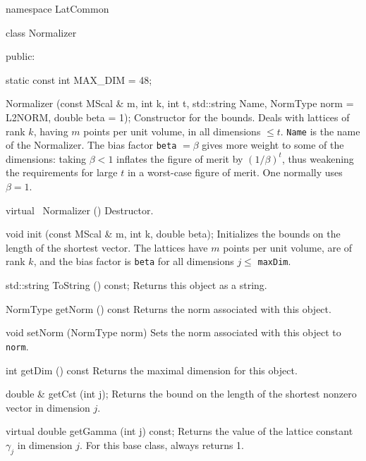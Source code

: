 namespace LatCommon {
          
class Normalizer {
public:

   static const int MAX_DIM = 48;

   Normalizer (const MScal & m, int k, int t, std::string Name,
               NormType norm = L2NORM, double beta = 1);
\endcode
 \tabb  Constructor for the bounds. Deals with lattices of rank $k$, having
   $m$ points per unit volume, in all dimensions  $\le t$. \texttt{Name}
   is the name of the Normalizer.
   The bias factor \texttt{beta} $= \beta$ gives more weight to some of the
   dimensions: taking $\beta < 1$ inflates the figure of merit by
   $(1/\beta)^t$, thus weakening the requirements for large $t$ in a 
   worst-case figure of merit.  %
   One normally uses $\beta = 1$. 
  \endtabb
\code

   virtual ~Normalizer ()  \endhide 
\endcode
 \tabb 
  Destructor.
 \endtabb
\code

   void init (const MScal & m, int k, double beta);
\endcode
 \tabb 
   Initializes the bounds on the length of the shortest vector. The lattices
   have $m$ points per unit volume, are of rank $k$, and the bias factor is 
   \texttt{beta} for all dimensions $j \le $ \texttt{maxDim}.
 \endtabb
\code

   std::string ToString () const;
\endcode
 \tabb 
   Returns this object as a string.
 \endtabb
\code

   NormType getNorm () const  \endhide
\endcode
 \tabb 
   Returns the norm associated with this object.
 \endtabb
\code

   void setNorm (NormType norm)  \endhide
\endcode
 \tabb 
   Sets the norm associated with this object to \texttt{norm}.
 \endtabb
\code

   int getDim () const  \endhide 
\endcode
 \tabb 
   Returns the maximal dimension for this object.
 \endtabb
\code

   double & getCst (int j);
\endcode
 \tabb 
   Returns the bound on the length of the shortest nonzero vector in
  dimension $j$.
 \endtabb
\code

   virtual double getGamma (int j) const;
\endcode
 \tabb 
   Returns the value of the lattice constant $\gamma_j$ in dimension  $j$.
  For this base class, always returns 1.
 \endtabb
\code


}}
